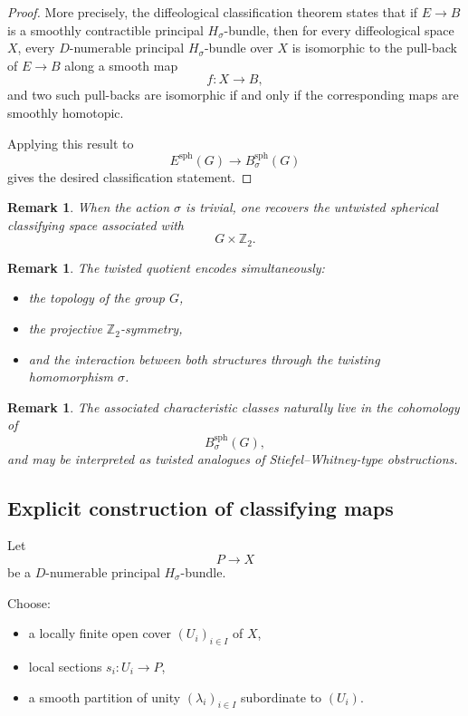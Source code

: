\documentclass[11pt]{amsart}
\newtheorem{remark}[definition]{Remark}
\begin{document}
\begin{proof}
More precisely, the diffeological classification theorem states that if
\(E\to B\) is a smoothly contractible principal \(H_\sigma\)-bundle, then for
every diffeological space \(X\), every \(D\)-numerable principal
\(H_\sigma\)-bundle over \(X\) is isomorphic to the pull-back of
\(E\to B\) along a smooth map
\[
f:X\to B,
\]
and two such pull-backs are isomorphic if and only if the corresponding maps
are smoothly homotopic.

Applying this result to
\[
E^{\mathrm{sph}}(G)
\to
B^{\mathrm{sph}}_\sigma(G)
\]
gives the desired classification statement.
\end{proof}

\begin{remark}
When the action \(\sigma\) is trivial, one recovers the untwisted spherical
classifying space associated with
\[
G\times \mathbb Z_2.
\]
\end{remark}

\begin{remark}
The twisted quotient encodes simultaneously:
\begin{itemize}
\item the topology of the group \(G\),
\item the projective \(\mathbb Z_2\)-symmetry,
\item and the interaction between both structures through the twisting
homomorphism \(\sigma\).
\end{itemize}
\end{remark}

\begin{remark}
The associated characteristic classes naturally live in the cohomology of
\[
B^{\mathrm{sph}}_\sigma(G),
\]
and may be interpreted as twisted analogues of Stiefel--Whitney-type
obstructions.
\end{remark}
\subsection{Explicit construction of classifying maps}

Let
\[
P\longrightarrow X
\]
be a \(D\)-numerable principal \(H_\sigma\)-bundle.

Choose:
\begin{itemize}
\item a locally finite open cover \((U_i)_{i\in I}\) of \(X\),
\item local sections \(s_i:U_i\to P\),
\item a smooth partition of unity \((\lambda_i)_{i\in I}\) subordinate to \((U_i)\).
\end{itemize}
\end{document}
